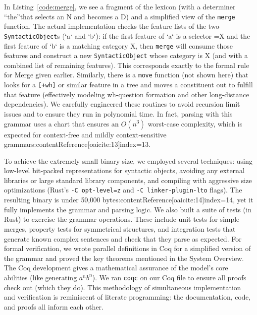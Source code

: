 \documentclass[11pt]{article}
\begin{document}
In Listing~\ref{code:merge}, we see a fragment of the lexicon (with a determiner \textquotedblleft the\textquotedblright that selects an N and becomes a D) and a simplified view of the \texttt{merge} function. The actual implementation checks the feature lists of the two \texttt{SyntacticObject}s (`a` and `b`): if the first feature of `a` is a selector =X and the first feature of `b` is a matching category X, then \texttt{merge} will consume those features and construct a new \texttt{SyntacticObject} whose category is X (and with a combined list of remaining features). This corresponds exactly to the formal rule for Merge given earlier. Similarly, there is a \texttt{move} function (not shown here) that looks for a \texttt{[+wh]} or similar feature in a tree and moves a constituent out to fulfill that feature (effectively modeling wh-question formation and other long-distance dependencies). We carefully engineered these routines to avoid recursion limit issues and to ensure they run in polynomial time. In fact, parsing with this grammar uses a chart that ensures an $O(n^3)$ worst-case complexity, which is expected for context-free and mildly context-sensitive grammars:contentReference[oaicite:13]{index=13}.

To achieve the extremely small binary size, we employed several techniques: using low-level bit-packed representations for syntactic objects, avoiding any external libraries or large standard library components, and compiling with aggressive size optimizations (Rust's \texttt{-C opt-level=z} and \texttt{-C linker-plugin-lto} flags). The resulting binary is under 50,000 bytes:contentReference[oaicite:14]{index=14}, yet it fully implements the grammar and parsing logic. We also built a suite of tests (in Rust) to exercise the grammar operations. These include unit tests for simple merges, property tests for symmetrical structures, and integration tests that generate known complex sentences and check that they parse as expected. For formal verification, we wrote parallel definitions in Coq for a simplified version of the grammar and proved the key theorems mentioned in the System Overview. The Coq development gives a mathematical assurance of the model's core abilities (like generating $a^n b^n$). We ran \texttt{coqc} on our Coq file to ensure all proofs check out (which they do). This methodology of simultaneous implementation and verification is reminiscent of literate programming: the documentation, code, and proofs all inform each other.
\end{document}
